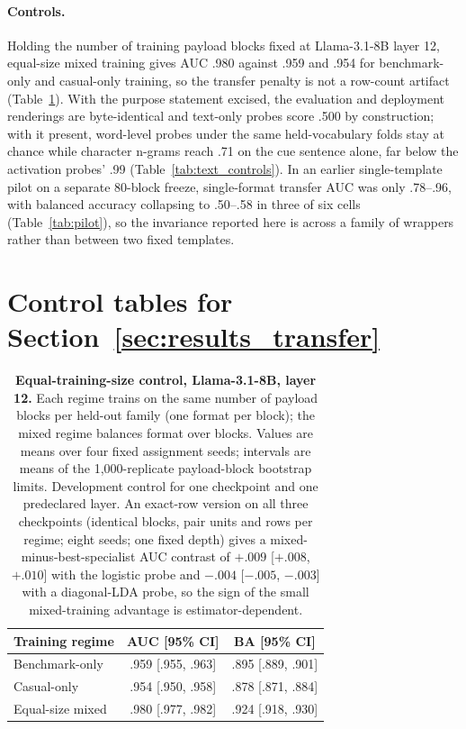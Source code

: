 \paragraph{Controls.}
Holding the number of training payload blocks fixed at Llama-3.1-8B layer 12,
equal-size mixed training gives AUC .980 against .959 and .954 for
benchmark-only and casual-only training, so the transfer penalty is not a
row-count artifact (Table~\ref{tab:equaln}). With the purpose statement
excised, the evaluation and deployment renderings are byte-identical and
text-only probes score .500 by construction; with it present, word-level
probes under the same held-vocabulary folds stay at chance while character
n-grams reach .71 on the cue sentence alone, far below the activation probes'
.99 (Table~\ref{tab:text_controls}). In an earlier single-template pilot on a
separate 80-block freeze, single-format transfer AUC was only .78--.96, with
balanced accuracy collapsing to .50--.58 in three of six cells
(Table~\ref{tab:pilot}), so the invariance reported here is across a family
of wrappers rather than between two fixed templates.

\appendix
\section{Control tables for Section~\ref{sec:results_transfer}}
\label{app:controls}

\begin{table}[ht]
\centering
\caption{
\textbf{Equal-training-size control, Llama-3.1-8B, layer 12.}
Each regime trains on the same number of payload blocks per held-out family
(one format per block); the mixed regime balances format over blocks. Values
are means over four fixed assignment seeds; intervals are means of the
1,000-replicate payload-block bootstrap limits. Development control for one
checkpoint and one predeclared layer. An exact-row version on all three
checkpoints (identical blocks, pair units and rows per regime; eight seeds;
one fixed depth) gives a mixed-minus-best-specialist AUC contrast of $+.009$
[$+.008$, $+.010$] with the logistic probe and $-.004$ [$-.005$, $-.003$] with a
diagonal-LDA probe, so the sign of the small mixed-training advantage is
estimator-dependent.
}
\label{tab:equaln}
\small
\setlength{\tabcolsep}{6pt}
\begin{tabular}{lcc}
\toprule
Training regime & AUC [95\% CI] & BA [95\% CI] \\
\midrule
Benchmark-only    & .959 [.955, .963] & .895 [.889, .901] \\
Casual-only       & .954 [.950, .958] & .878 [.871, .884] \\
Equal-size mixed  & .980 [.977, .982] & .924 [.918, .930] \\
\bottomrule
\end{tabular}
\end{table}

